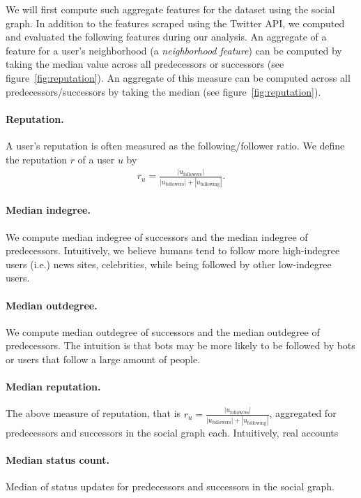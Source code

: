 We will first compute such aggregate features for the dataset using the social graph. In addition to the features scraped using the Twitter API, we computed and evaluated the following features during our analysis. An aggregate of a  feature for a user's neighborhood (a \emph{neighborhood feature}) can be computed by taking the median value across all predecessors or successors (see figure~\ref{fig:reputation}). An aggregate of this measure can be computed across all predecessors/successors by taking the median (see figure~\ref{fig:reputation}).

\paragraph{Reputation.} A user's reputation is often measured as the following/follower ratio. We define the reputation $r$ of a user $u$ by
\begin{align*}
    r_u = \frac{ |u_\text{followers}| }{ |u_\text{followers}| + |u_\text{following}|}.
\end{align*}

\paragraph{Median indegree.} We compute median indegree of successors and the median indegree of predecessors. Intuitively, we believe humans tend to follow more high-indegree users (i.e.) news sites, celebrities, while being followed by other low-indegree users.

\paragraph{Median outdegree.} We compute median outdegree of successors and the median outdegree of predecessors. The intuition is that bots may be more likely to be followed by bots or users that follow a large amount of people.

\paragraph{Median reputation.} The above measure of reputation, that is $r_u = \frac{ |u_\text{followers}| }{ |u_\text{followers}| + |u_\text{following}|}$, aggregated for predecessors and successors in the social graph each. Intuitively, real accounts 

\paragraph{Median status count.} Median of status updates for predecessors and successors in the social graph.

